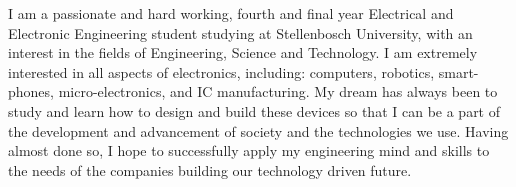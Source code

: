 

I am a passionate and hard working, fourth and final year Electrical and Electronic Engineering student studying at Stellenbosch University, with an interest in the fields of Engineering, Science and Technology.  
I am extremely interested in all aspects of electronics, including: computers,  robotics, smart-phones, micro-electronics, and IC manufacturing.  
My dream has always been to study and learn how to design and build these devices so that I can be a part of the development and advancement of society and the technologies we use. Having almost done so, I hope to successfully apply my engineering mind and skills to the needs of the companies building our technology driven future.


